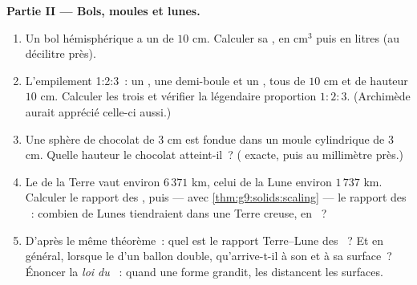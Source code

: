 \begin{problem}
\medskip
\noindent\textbf{Partie II --- Bols, moules et lunes.}
\begin{enumerate}[resume]
  \item Un bol hémisphérique a un  de $10$ cm. Calculer sa
        , en cm$^3$ puis en litres (au décilitre près).
  \item L'empilement 1:2:3~: un , une demi-boule et un ,
        tous de  $10$ cm et de hauteur $10$ cm. Calculer les
        trois  et vérifier la légendaire proportion
        $1 : 2 : 3$. (Archimède aurait apprécié celle-ci aussi.)
  \item Une sphère de chocolat de  $3$ cm est fondue dans un
        moule cylindrique de  $3$ cm. Quelle hauteur le
        chocolat atteint-il~? ( exacte, puis au millimètre
        près.)
  \item Le  de la Terre vaut environ $6\,371$ km, celui de la
        Lune environ $1\,737$ km. Calculer le rapport des ,
        puis --- avec \cref{thm:g9:solids:scaling} --- le rapport
        des ~: combien de Lunes tiendraient dans une Terre
        creuse, en ~?
  \item D'après le même théorème~: quel est le rapport
        Terre--Lune des \emph{}~? Et en général, lorsque le
         d'un ballon double, qu'arrive-t-il à son  et à
        sa surface~? Énoncer la \emph{loi du }~: quand une
        forme grandit, les  distancent les surfaces.
\end{enumerate}


\end{problem}
